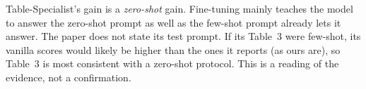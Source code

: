 \begin{interpretation}
Table-Specialist's gain is a \emph{zero-shot} gain. Fine-tuning mainly teaches the model to answer the zero-shot
prompt as well as the few-shot prompt already lets it answer. The paper does not state its test prompt. If its
Table~3 were few-shot, its vanilla scores would likely be higher than the ones it reports (as ours are), so Table~3 is
most consistent with a zero-shot protocol. This is a reading of the evidence, not a confirmation.
\end{interpretation}
